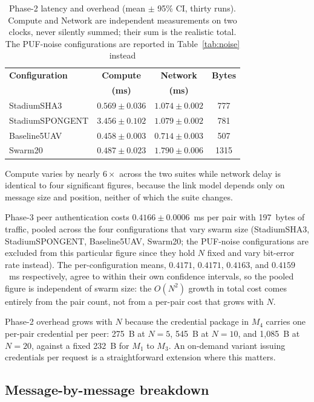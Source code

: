 \documentclass[journal]{IEEEtran}
\begin{document}
\begin{table}[H]
\centering
\caption{Phase-2 latency and overhead (mean $\pm$ 95\% CI, thirty runs).
Compute and Network are independent measurements on two clocks, never silently
summed; their sum is the realistic total. The PUF-noise configurations are
reported in Table~\ref{tab:noise} instead}
\label{tab:latency}
\scriptsize
\setlength{\tabcolsep}{2.4pt}
\begin{tabular}{@{}lccc@{}}
\toprule
\textbf{Configuration} & \textbf{Compute} &
\textbf{Network} & \textbf{Bytes} \\
 & \textbf{(ms)} & \textbf{(ms)} & \\
\midrule
StadiumSHA3     & $0.569{\pm}0.036$ & $1.074{\pm}0.002$ & 777 \\
StadiumSPONGENT & $3.456{\pm}0.102$ & $1.079{\pm}0.002$ & 781 \\
Baseline5UAV    & $0.458{\pm}0.003$ & $0.714{\pm}0.003$ & 507 \\
Swarm20         & $0.487{\pm}0.023$ & $1.790{\pm}0.006$ & 1315 \\
\bottomrule
\end{tabular}
\end{table}

Compute varies by nearly $6\times$ across the two suites while network delay is
identical to four significant figures, because the link model depends only on
message size and position, neither of which the suite changes.

Phase-3 peer authentication costs $0.4166 \pm 0.0006$~ms per pair with 197~bytes
of traffic, pooled across the four configurations that vary swarm size
(StadiumSHA3, StadiumSPONGENT, Baseline5UAV, Swarm20; the PUF-noise
configurations are excluded from this particular figure since they hold $N$
fixed and vary bit-error rate instead). The per-configuration means, $0.4171$,
$0.4171$, $0.4163$, and $0.4159$~ms respectively, agree to within their own
confidence intervals, so the pooled figure is independent of swarm size: the
$O(N^2)$ growth in total cost comes entirely from the pair count, not from a
per-pair cost that grows with $N$.

Phase-2 overhead grows with $N$ because the credential package in $M_4$ carries
one per-pair credential per peer: 275~B at $N=5$, 545~B at $N=10$, and
1{,}085~B at $N=20$, against a fixed 232~B for $M_1$ to $M_3$. An on-demand
variant issuing credentials per request is a straightforward extension where
this matters.

\subsection{Message-by-message breakdown}
\end{document}

